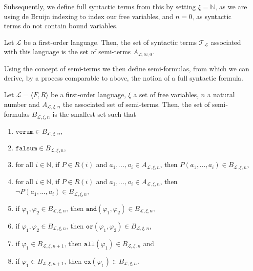 Subsequently, we define full syntactic terms from this by setting $\xi = \mathbb{N}$, as we are using de Bruijn indexing to index our free variables, and $n = 0$, as syntactic terms do not contain bound variables.

\begin{definition}\label{def:syn-t}
    \leanok
    Let $\mathcal{L}$ be a first-order language. Then, the set of syntactic terms $\mathcal{T}_{\mathcal{L}}$ associated with this language is the set of semi-terms $A_{\mathcal{L},\mathbb{N},0}$. 
\end{definition}

Using the concept of semi-terms we then define semi-formulas, from which we can derive, by a process comparable to above, the notion of a full syntactic formula.

\begin{definition}\label{def:sem-f}
    \leanok
    Let $\mathcal{L} = \langle F, R \rangle$ be a first-order language, $\xi$ a set of free variables, $n$ a natural number and $A_{\mathcal{L},\xi,n}$ the associated set of semi-terms. Then, the set of semi-formulas $B_{\mathcal{L},\xi,n}$ is the smallest set such that 
    \begin{enumerate}
        \item $\texttt{verum} \in B_{\mathcal{L},\xi,n}$,
        \item $\texttt{falsum} \in B_{\mathcal{L},\xi,n}$,
        \item for all $i \in \mathbb{N}$, if $P \in R(i)$ and $a_1,...,a_i \in A_{\mathcal{L},\xi,n}$, then $P(a_1,...,a_i) \in B_{\mathcal{L},\xi,n}$,
        \item for all $i \in \mathbb{N}$, if $P \in R(i)$ and $a_1,...,a_i \in A_{\mathcal{L},\xi,n}$, then $\neg P(a_1,...,a_i) \in B_{\mathcal{L},\xi,n}$,
        \item if $\varphi_1,\varphi_2 \in B_{\mathcal{L},\xi,n}$, then $\texttt{and}(\varphi_1,\varphi_2) \in B_{\mathcal{L},\xi,n}$,
        \item if $\varphi_1,\varphi_2 \in B_{\mathcal{L},\xi,n}$, then $\texttt{or}(\varphi_1,\varphi_2) \in B_{\mathcal{L},\xi,n}$,
        \item if $\varphi_1 \in B_{\mathcal{L},\xi,n+1}$, then $\texttt{all}(\varphi_1) \in B_{\mathcal{L},\xi,n}$ and
        \item if $\varphi_1 \in B_{\mathcal{L},\xi,n+1}$, then $\texttt{ex}(\varphi_1) \in B_{\mathcal{L},\xi,n}$.
    \end{enumerate}
\end{definition}


